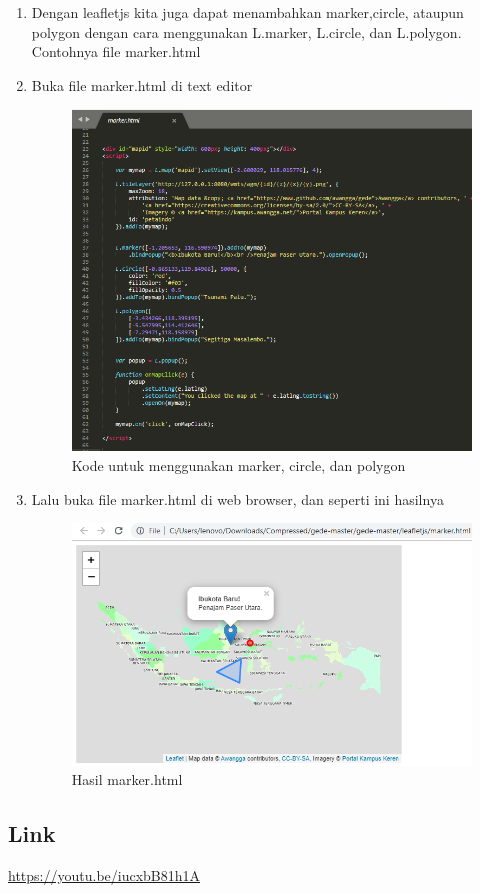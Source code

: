 \begin{enumerate}
	\item Dengan leafletjs kita juga dapat menambahkan marker,circle, ataupun polygon dengan cara menggunakan L.marker, L.circle,  dan L.polygon. Contohnya file marker.html
    \hfill\break
	
	\item Buka file marker.html di text editor
    \hfill\break
	\begin{figure}[H]
		\includegraphics[width=12cm]{figures/Tugas5/1174071/4.png}
		\centering
		\caption{Kode untuk menggunakan marker, circle, dan polygon}
	\end{figure}

	\item Lalu buka file marker.html di web browser, dan seperti ini hasilnya
    \hfill\break
	\begin{figure}[H]
		\includegraphics[width=12cm]{figures/Tugas5/1174071/5.png}
		\centering
		\caption{Hasil marker.html}
	\end{figure}
\end{enumerate}

\subsection{Link}
\url{https://youtu.be/iucxbB81h1A}
  